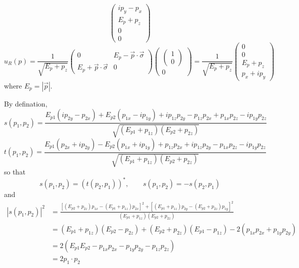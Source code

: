 \begin{problembody}
\begin{equation*}
\begin{pmatrix}
            ip_y - p_x \\
            E_p + p_z \\
            0 \\
            0
        \end{pmatrix}
    \end{equation*}
    \begin{equation*}
        u_R(p) = \frac{1}{\sqrt{E_p + p_z}} \begin{pmatrix}
            0 & E_p - \vec{p}\cdot\vec{\sigma} \\
            E_p + \vec{p}\cdot\vec{\sigma} & 0
        \end{pmatrix} \begin{pmatrix}
            \begin{pmatrix}
                1 \\ 0
            \end{pmatrix} \\
            0
        \end{pmatrix} = \frac{1}{\sqrt{E_p + p_z}} \begin{pmatrix}
            0 \\
            0 \\
            E_p + p_z \\
            p_x + ip_y
        \end{pmatrix}
    \end{equation*}
    where $E_p = |\vec{p}|$.

    \item By defination,
    \begin{equation*}
        s(p_1, p_2) = \frac{
            E_{p1}(ip_{2y} - p_{2x}) + E_{p2}(p_{1x} - ip_{1y}) + ip_{1z}p_{2y}
         - p_{1z}p_{2x} + p_{1x}p_{2z} - ip_{1y}p_{2z}
        } {\sqrt{(E_{p1} + p_{1z})(E_{p2} + p_{2z})}}
    \end{equation*}
    \begin{equation*}
        t(p_1, p_2) = \frac{
            E_{p1}(p_{2x} + ip_{2y}) - E_{p2}(p_{1x} + ip_{1y}) + p_{1z}p_{2x}
         + ip_{1z}p_{2y} - p_{1x}p_{2z} - ip_{1y}p_{2z}
        } {\sqrt{(E_{p1} + p_{1z})(E_{p2} + p_{2z})}}
    \end{equation*}
    so that
    \begin{equation*}
        s(p_1, p_2) = (t(p_2, p_1))^\ast, \qquad s(p_1, p_2) = -s(p_2, p_1)
    \end{equation*}
    and 
    \begin{align*}
        \left| s(p_1, p_2) \right|^2 & = \frac{
            \left[(E_{p2} + p_{2z})p_{1x} - (E_{p1} + p_{1z})p_{2x}\right]^2 
            + \left[(E_{p1} + p_{1z})p_{2y} - (E_{p2} + p_{2z})p_{1y}\right]^2
        }
        {(E_{p1} + p_{1z})(E_{p2} + p_{2z})} \\
        & = (E_{p1} + p_{1z})(E_{p2} - p_{2z}) + (E_{p2} + p_{2z})(E_{p1} - p_{1z}) - 2(p_{1x}p_{2x} + p_{1y}p_{2y}) \\
        & = 2(E_{p1}E_{p2} - p_{1x}p_{2x} - p_{1y}p_{2y} - p_{1z}p_{2z})\\
        & = 2 p_1 \cdot p_2
    \end{align*}
\end{problembody}

